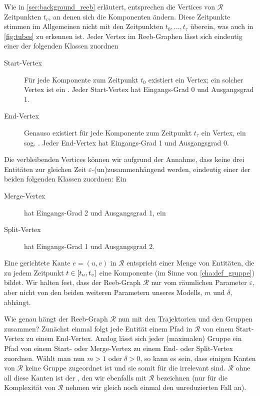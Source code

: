 Wie in \cref{sec:background_reeb} erläutert, entsprechen die Vertices von $\mathcal{R}$ Zeitpunkten $t_v$, an denen sich die Komponenten ändern.
Diese Zeitpunkte stimmen im Allgemeinen nicht mit den Zeitpunkten $t_0, \ldots, t_\tau$ überein, was auch in \cref{fig:tubes} zu erkennen ist.
Jeder Vertex im Reeb-Graphen lässt sich eindeutig einer der folgenden Klassen zuordnen
\begin{description}
	\item[Start-Vertex] Für jede Komponente zum Zeitpunkt $t_0$ existiert ein Vertex; ein solcher Vertex ist ein .
	Jeder Start-Vertex hat Eingangs-Grad 0 und Ausgangsgrad 1.
	\item[End-Vertex] Genauso existiert für jede Komponente zum Zeitpunkt $t_\tau$ ein Vertex, ein sog. .
	Jeder End-Vertex hat Eingangs-Grad 1 und Ausgangsgrad 0.
\end{description}
Die verbleibenden Vertices können wir aufgrund der Annahme, dass keine drei Entitäten zur gleichen Zeit $\varepsilon$-(un)zusammenhängend werden, eindeutig einer der beiden folgenden Klassen zuordnen: Ein
\begin{description}
	\item[Merge-Vertex] hat Eingangs-Grad 2 und Ausgangsgrad 1, ein
	\item[Split-Vertex] hat Eingangs-Grad 1 und Ausgangsgrad 2.
\end{description}
Eine gerichtete Kante $e=(u,v)$ in $\mathcal{R}$ entspricht einer Menge von Entitäten, die zu jedem Zeitpunkt $t \in \benbrace*{t_u,t_v}$ eine Komponente (im Sinne von \cref{cha:def_gruppe}) bildet.
Wir halten fest, dass der Reeb-Graph $\mathcal{R}$ nur vom räumlichen Parameter $\varepsilon$, aber nicht von den beiden weiteren Parametern unseres Modells, $m$ und $\delta$, abhängt.

Wie genau hängt der Reeb-Graph $\mathcal{R}$ nun mit den Trajektorien und den Gruppen zusammen?
Zunächst einmal folgt jede Entität einem Pfad in $\mathcal{R}$ von einem Start-Vertex zu einem End-Vertex.
Analog lässt sich jeder (maximalen) Gruppe ein Pfad von einem Start- oder Merge-Vertex zu einem End- oder Split-Vertex zuordnen.
Wählt man nun $m > 1$ oder $\delta > 0$, so kann es sein, dass einigen Kanten von $\mathcal{R}$ keine Gruppe zugeordnet ist und sie somit für die \GrpStruktur irrelevant sind.
$\mathcal{R}$ ohne all diese Kanten ist der , den wir ebenfalls mit $\mathcal{R}$ bezeichnen (nur für die Komplexität von $\mathcal{R}$ nehmen wir gleich noch einmal den unreduzierten Fall an).



